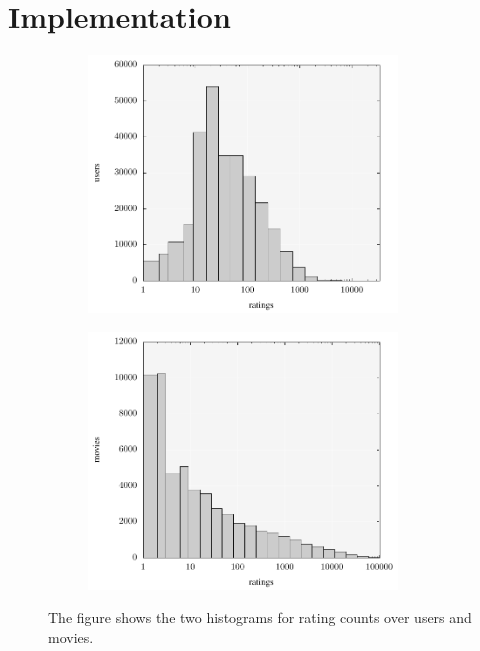 \documentclass[crop=false,10pt]{standalone}
\begin{document}
  \section{Implementation} %
  \label{sec:Implementation}
    \begin{figure}[h]
      \center
      \begin{subfigure}[b]{0.49\textwidth}
        \center
        \includegraphics[width=0.9\textwidth]{figures/movielens-user-histogram.pdf}
      \end{subfigure}
      \hfill
      \begin{subfigure}[b]{0.49\textwidth}
        \center
        \includegraphics[width=0.9\textwidth]{figures/movielens-movie-histogram.pdf}
      \end{subfigure}
      \caption{%
        The figure shows the two histograms for rating counts over users and movies.
      }
      \label{fig:rating-histograms}
    \end{figure}
\end{document}
